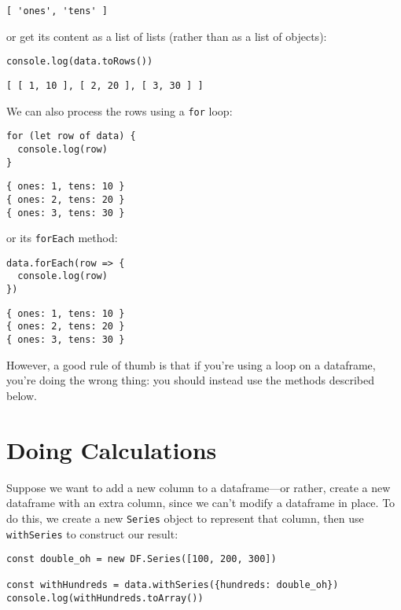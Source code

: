 \begin{verbatim}
[ 'ones', 'tens' ]
\end{verbatim}

\noindent
or get its content as a list of lists (rather than as a list of objects):

\begin{verbatim}
console.log(data.toRows())
\end{verbatim}

\begin{verbatim}
[ [ 1, 10 ], [ 2, 20 ], [ 3, 30 ] ]
\end{verbatim}

We can also process the rows using a \texttt{for} loop:

\begin{verbatim}
for (let row of data) {
  console.log(row)
}
\end{verbatim}

\begin{verbatim}
{ ones: 1, tens: 10 }
{ ones: 2, tens: 20 }
{ ones: 3, tens: 30 }
\end{verbatim}

\noindent
or its \texttt{forEach} method:

\begin{verbatim}
data.forEach(row => {
  console.log(row)
})
\end{verbatim}

\begin{verbatim}
{ ones: 1, tens: 10 }
{ ones: 2, tens: 20 }
{ ones: 3, tens: 30 }
\end{verbatim}

\noindent
However,
a good rule of thumb is that if you're using a loop on a dataframe,
you're doing the wrong thing:
you should instead use the methods described below.

\section{Doing Calculations}\label{s:dataforge-calc}

Suppose we want to add a new column to a dataframe---or rather,
create a new dataframe with an extra column,
since we can't modify a dataframe in place.
To do this,
we create a new \texttt{Series} object to represent that column,
then use \texttt{withSeries} to construct our result:

\begin{verbatim}
const double_oh = new DF.Series([100, 200, 300])

const withHundreds = data.withSeries({hundreds: double_oh})
console.log(withHundreds.toArray())
\end{verbatim}

